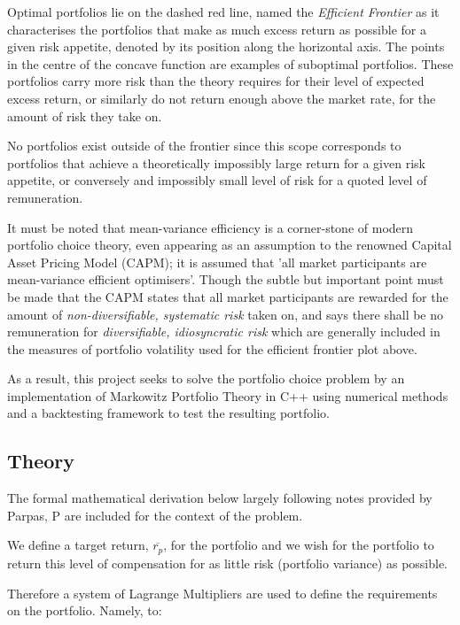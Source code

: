 \documentclass{article}
\begin{document}
Optimal portfolios lie on the dashed red line, named the \textit{Efficient Frontier} as it characterises the portfolios that make as much excess return as possible for a given risk appetite, denoted by its position along the horizontal axis. The points in the centre of the concave function are examples of suboptimal portfolios. These portfolios carry more risk than the theory requires for their level of expected excess return, or similarly do not return enough above the market rate, for the amount of risk they take on.

No portfolios exist outside of the frontier since this scope corresponds to portfolios that achieve a theoretically impossibly large return for a given risk appetite, or conversely  and impossibly small level of risk for a quoted level of remuneration.


It must be noted that mean-variance efficiency is a corner-stone of modern portfolio choice theory, even appearing as an assumption to the renowned Capital Asset Pricing Model \cite{capm} (CAPM); it is assumed that 'all market participants are mean-variance efficient optimisers'. Though the subtle but important point must be made that the CAPM states that all market participants are rewarded for the amount of \textit{non-diversifiable, systematic risk} taken on, and says there shall be no remuneration for \textit{diversifiable, idiosyncratic risk} which are generally included in the measures of portfolio volatility used for the efficient frontier plot above.


As a result, this project seeks to solve the portfolio choice problem by an implementation of Markowitz Portfolio Theory \cite{mpt} in C++ using numerical methods and a backtesting framework to test the resulting portfolio.



\subsection{Theory}
\label{sec:theory}

The formal mathematical derivation below largely following notes provided by Parpas, P \cite{notes} are included for the context of the problem.

We define a target return, $\overline{r_p}$, for the portfolio and we wish for the portfolio to return this level of compensation for as little risk (portfolio variance) as possible. 

Therefore a system of Lagrange Multipliers are used to define the requirements on the portfolio. Namely, to:
\end{document}
